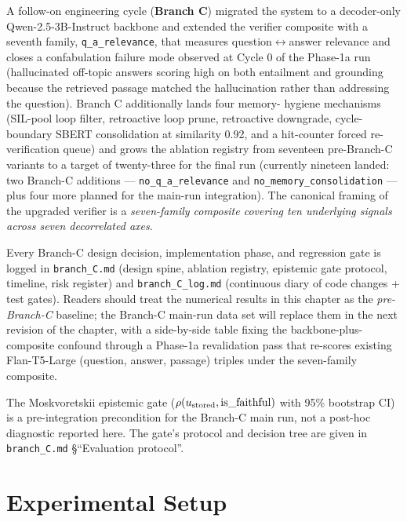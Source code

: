 A follow-on engineering cycle (\textbf{Branch C}) migrated the system
to a decoder-only Qwen-2.5-3B-Instruct backbone and extended the
verifier composite with a seventh family, \texttt{q\_a\_relevance}, that
measures question$\leftrightarrow$answer relevance and closes a
confabulation failure mode observed at Cycle 0 of the Phase-1a run
(hallucinated off-topic answers scoring high on both entailment and
grounding because the retrieved passage matched the hallucination rather
than addressing the question). Branch C additionally lands four memory-
hygiene mechanisms (SIL-pool loop filter, retroactive loop prune,
retroactive downgrade, cycle-boundary SBERT consolidation at similarity
0.92, and a hit-counter forced re-verification queue) and grows the
ablation registry from seventeen pre-Branch-C variants to a target of
twenty-three for the final run (currently nineteen landed: two Branch-C
additions --- \texttt{no\_q\_a\_relevance} and
\texttt{no\_memory\_consolidation} --- plus four more planned for the
main-run integration). The canonical framing of the upgraded verifier
is a \emph{seven-family composite covering ten underlying signals across
seven decorrelated axes}.

Every Branch-C design decision, implementation phase, and regression
gate is logged in \texttt{branch\_C.md} (design spine, ablation
registry, epistemic gate protocol, timeline, risk register) and
\texttt{branch\_C\_log.md} (continuous diary of code changes + test
gates). Readers should treat the numerical results in this chapter as
the \emph{pre-Branch-C} baseline; the Branch-C main-run data set will
replace them in the next revision of the chapter, with a side-by-side
table fixing the backbone-plus-composite confound through a Phase-1a
revalidation pass that re-scores existing Flan-T5-Large (question,
answer, passage) triples under the seven-family composite.

The Moskvoretskii epistemic gate
($\rho(u_{\text{stored}}, \mathrm{is\_faithful})$ with 95\% bootstrap CI) is a
pre-integration precondition for the Branch-C main run, not a post-hoc
diagnostic reported here. The gate's protocol and decision tree are
given in \texttt{branch\_C.md} \S``Evaluation protocol''.

\section{Experimental Setup}
\label{sec:exp-setup}

